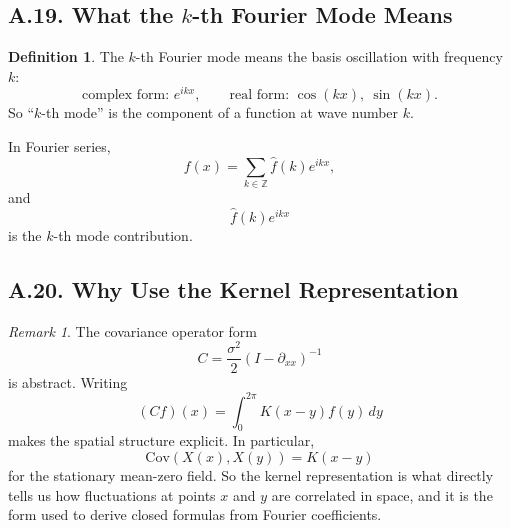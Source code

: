 \documentclass[11pt]{article}
\theoremstyle{definition}
\newtheorem{definition}{Definition}
\theoremstyle{remark}
\newtheorem{remark}{Remark}
\begin{document}
\subsection*{A.19. What the $k$-th Fourier Mode Means}
\begin{definition}
The $k$-th Fourier mode means the basis oscillation with frequency $k$:
\[
\text{complex form: } e^{ikx},
\qquad
\text{real form: } \cos(kx),\ \sin(kx).
\]
So ``$k$-th mode'' is the component of a function at wave number $k$.

In Fourier series,
\[
f(x)=\sum_{k\in\mathbb Z}\widehat f(k)e^{ikx},
\]
and
\[
\widehat f(k)e^{ikx}
\]
is the $k$-th mode contribution.
\end{definition}

\subsection*{A.20. Why Use the Kernel Representation}
\begin{remark}
The covariance operator form
\[
C=\frac{\sigma^2}{2}(I-\partial_{xx})^{-1}
\]
is abstract. Writing
\[
(Cf)(x)=\int_0^{2\pi}K(x-y)f(y)\,dy
\]
makes the spatial structure explicit. In particular,
\[
\mathrm{Cov}(X(x),X(y))=K(x-y)
\]
for the stationary mean-zero field. So the kernel representation is what directly tells us how fluctuations at points $x$ and $y$ are correlated in space, and it is the form used to derive closed formulas from Fourier coefficients.
\end{remark}
\end{document}
